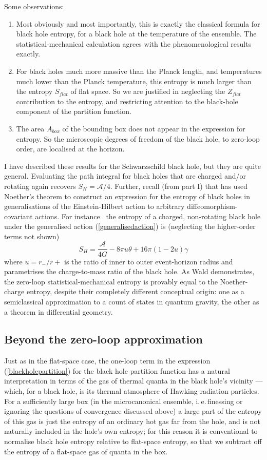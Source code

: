 \documentclass{article}
\newcommand{\iec}{\mbox{i.\,e.\,}}
\newcommand{\mc}[1]{\ensuremath{\mathcal{#1}}}
\newcommand{\be}{\begin{equation}}
\newcommand{\ee}{\end{equation}}
\begin{document}
Some observations:
\begin{enumerate}
\item Most obviously and most importantly, this is exactly the classical formula for black hole entropy, for a black hole at the temperature of the ensemble. The statistical-mechanical calculation agrees with the phenomenological results exactly.
\item For black holes much more massive than the Planck length, and temperatures much lower than the Planck temperature, this entropy is much larger than the entropy $S_{flat}$ of flat space. So we are justified in neglecting the $Z_{flat}$ contribution to the entropy, and restricting attention to the black-hole component of the partition function.
\item The area $A_{box}$ of the bounding box does not appear in the expression for entropy. So the microscopic degrees of freedom of the black hole, to zero-loop order, are localised at the horizon. 
\end{enumerate}
I have described these results for the Schwarzschild black hole, but they are quite general. Evaluating the path integral for black holes that are charged and/or rotating again recovers $S_H=\mc{A}/4$. Further, recall (from part I) that  has used Noether's theorem to construct an expression for the entropy of black holes in generalisations of the Einstein-Hilbert action to arbitrary diffeomorphism-covariant actions. For instance~\cite{demersetal} the entropy of a charged, non-rotating black hole under the generalised action (\ref{generalisedaction}) is (neglecting the higher-order terms not shown)
\be \label{blackholenoether}
S_H = \frac{\mc{A}}{4 G} - 8 \pi u \theta + 16\pi  (1-2u) \gamma
\ee
where $u=r_-/r+$ is the ratio of inner to outer event-horizon radius and parametrises the charge-to-mass ratio of the black hole.
As Wald demonstrates, the zero-loop statistical-mechanical entropy is provably equal to the Noether-charge entropy, despite their completely different conceptual origin: one as  a semiclassical approximation to a count of states in quantum gravity, the other as a theorem in differential geometry.

\subsection{Beyond the zero-loop approximation}\label{oneloop}

Just as in the flat-space case, the one-loop term in the expression (\ref{blackholepartition}) for the black hole partition function has a natural interpretation in terms of the gas of thermal quanta in the black hole's vicinity --- which, for a black hole, is its thermal atmosphere of Hawking-radiation particles. For a sufficiently large box (in the microcanonical ensemble, \iec finessing or ignoring the questions of convergence discussed above) a large part of the entropy of this gas is just the entropy of an ordinary hot gas far from the hole, and is not naturally included in the hole's own entropy; for this reason it is conventional to normalise black hole entropy relative to flat-space entropy, so that we subtract off the entropy of a flat-space gas of quanta in the box. 
\end{document}
